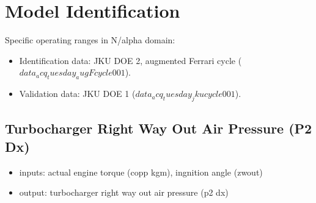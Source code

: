 
\section{Model Identification}
\label{sec:modelidentification}

Specific operating ranges  in N/alpha domain:
\begin{itemize}
	\item{Identification data: JKU DOE 2, augmented Ferrari cycle ($data_acq_tuesday_augFcycle001$).}
	\item{Validation data: JKU DOE 1 ($data_acq_tuesday_jkucycle001$).}
\end{itemize}



\subsection{Turbocharger Right Way Out Air Pressure (P2 Dx)}
\begin{itemize}
	\item{inputs: actual engine torque (copp kgm), ingnition angle (zwout)}
	\item{output: turbocharger right way out air pressure (p2 dx)}
\end{itemize}	

%

